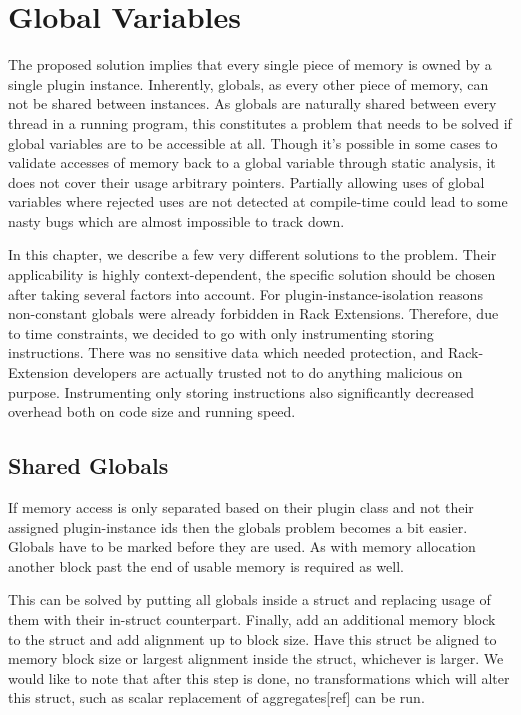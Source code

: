\chapter {Global Variables}

The proposed solution implies that every single piece of memory is owned by a
single plugin instance.
Inherently, globals, as every other piece of memory, can not be shared between
instances.
As globals are naturally shared between every thread in a running program, this
constitutes a problem that needs to be solved if global variables are to be
accessible at all.
Though it's possible in some cases to validate accesses of memory back to a
global variable through static analysis, it does not cover their usage arbitrary
pointers.
Partially allowing uses of global variables where rejected uses are not detected
at compile-time could lead to some nasty bugs which are almost impossible to
track down.

In this chapter, we describe a few very different solutions to the problem.
Their applicability is highly context-dependent, the specific solution should be
chosen after taking several factors into account.
For plugin-instance-isolation reasons non-constant globals were already
forbidden in Rack Extensions.
Therefore, due to time constraints, we decided to go with only instrumenting
storing instructions.
There was no sensitive data which needed protection, and Rack-Extension
developers are actually trusted not to do anything malicious on purpose.
Instrumenting only storing instructions also significantly decreased overhead
both on code size and running speed.


\section {Shared Globals}

If memory access is only separated based on their plugin class and not their
assigned plugin-instance ids then the globals problem becomes a bit easier.
Globals have to be marked before they are used.
As with memory allocation another block past the end of usable memory is
required as well.

This can be solved by putting all globals inside a struct and replacing usage of
them with their in-struct counterpart.
Finally, add an additional memory block to the struct and add alignment up to
block size.
Have this struct be aligned to memory block size or largest alignment inside the
struct, whichever is larger.
We would like to note that after this step is done, no transformations which
will alter this struct, such as scalar replacement of aggregates[ref] can be
run.

